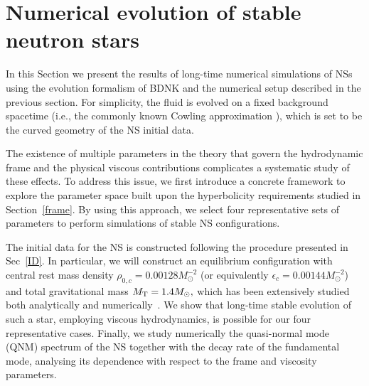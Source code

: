 \documentclass[prd,aps,twocolumn,floats,floatfix,nofootinbib,superscriptaddress] {revtex4-1}
\begin{document}
\section{Numerical evolution of stable neutron stars}\label{simuNS}

In this Section we present the results of long-time numerical simulations of NSs using the evolution formalism of BDNK and the numerical setup described in the previous section.  For simplicity, the fluid is evolved on a fixed background spacetime (i.e., the commonly known Cowling approximation \cite{10.1093/mnras/101.8.367}), which is set to be the curved geometry of the NS initial data.

The existence of multiple parameters in the theory that govern the hydrodynamic frame and the physical viscous contributions complicates a systematic study of these effects.  To address this issue, we first introduce a concrete framework to explore the parameter space built upon the hyperbolicity requirements studied in Section~\ref{frame}. By using this approach, we select four representative sets of parameters to perform simulations of stable NS configurations. 

The initial data for the NS is constructed following the procedure presented in Sec~\ref{ID}. In particular, we will construct an equilibrium configuration with central rest mass density $\rho_{0,c}=0.00128 M_{\odot}^{-2}$ (or equivalently $\epsilon_c=0.00144 M_{\odot}^{-2} $) and total gravitational mass $M_{\rm{T}}=1.4 M_{\odot},$ which has been extensively studied both analytically and numerically~\cite{CCC,Font:2001ew}. We show that long-time stable evolution of such a star, employing viscous hydrodynamics, is possible for our four representative cases. Finally, we study numerically the quasi-normal mode (QNM) spectrum of the NS together with the decay rate of the fundamental mode, analysing its dependence with respect to the frame and viscosity parameters. 

\end{document}
